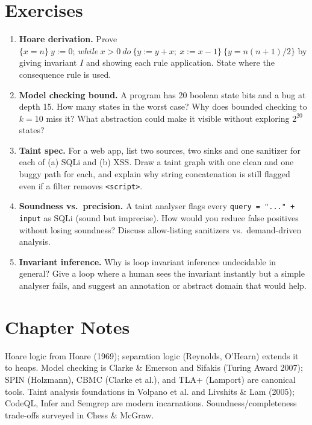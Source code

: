 \section{Exercises}
\label{sec:ch06-exercises}
\begin{enumerate}[label=E6.\arabic*, leftmargin=*, itemsep=0.6em]
    \item \textbf{Hoare derivation.} Prove $\{x=n\}~y:=0;~while~x>0~do~\{y:=y+x;~x:=x-1\}~\{y=n(n+1)/2\}$ by giving invariant $I$ and showing each rule application. State where the consequence rule is used.
    \item \textbf{Model checking bound.} A program has 20 boolean state bits and a bug at depth 15. How many states in the worst case? Why does bounded checking to $k=10$ miss it? What abstraction could make it visible without exploring $2^{20}$ states?
    \item \textbf{Taint spec.} For a web app, list two sources, two sinks and one sanitizer for each of (a) SQLi and (b) XSS. Draw a taint graph with one clean and one buggy path for each, and explain why string concatenation is still flagged even if a filter removes \texttt{<script>}.
    \item \textbf{Soundness vs.\ precision.} A taint analyser flags every \texttt{query = "..." + input} as SQLi (sound but imprecise). How would you reduce false positives without losing soundness? Discuss allow-listing sanitizers vs.\ demand-driven analysis.
    \item \textbf{Invariant inference.} Why is loop invariant inference undecidable in general? Give a loop where a human sees the invariant instantly but a simple analyser fails, and suggest an annotation or abstract domain that would help.
\end{enumerate}

\section*{Chapter Notes}
Hoare logic from Hoare (1969); separation logic (Reynolds, O'Hearn) extends it to heaps. Model checking is Clarke \& Emerson and Sifakis (Turing Award 2007); SPIN (Holzmann), CBMC (Clarke et al.), and TLA+ (Lamport) are canonical tools. Taint analysis foundations in Volpano et al. and Livshits \& Lam (2005); CodeQL, Infer and Semgrep are modern incarnations. Soundness/completeness trade-offs surveyed in Chess \& McGraw.

